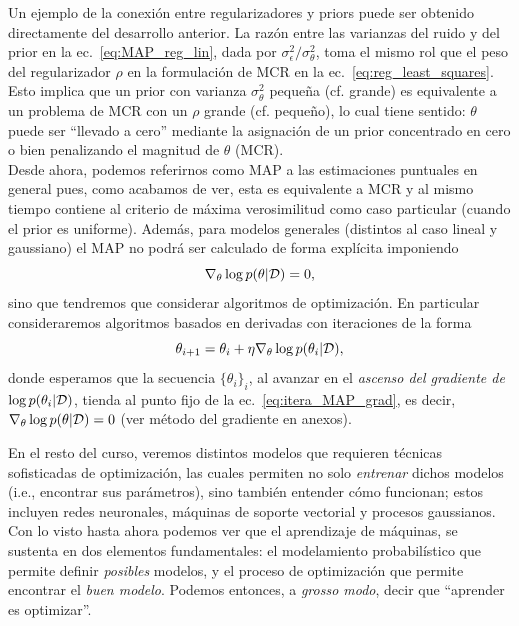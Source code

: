 Un ejemplo de la conexión entre regularizadores y priors puede ser obtenido directamente del desarrollo anterior. La razón entre las varianzas del ruido y del prior en la ec.~\eqref{eq:MAP_reg_lin}, dada por $\sigma_\epsilon^2/\sigma_\theta^2$, toma el mismo rol que el peso del regularizador $\rho$ en la formulación de MCR en la  ec.~\eqref{eq:reg_least_squares}. Esto implica que un prior con varianza $\sigma_\theta^2$ pequeña (cf. grande) es equivalente a un problema de MCR con un $\rho$ grande (cf. pequeño), lo cual tiene sentido:  $\theta$ puede ser ``llevado a cero'' mediante la asignación de un prior concentrado en cero o bien penalizando el magnitud de $\theta$ (MCR).\\

Desde ahora, podemos referirnos como MAP a las estimaciones puntuales en general pues, como acabamos de ver, esta es equivalente a MCR y al mismo tiempo contiene al criterio de máxima verosimilitud como caso particular (cuando el prior es uniforme). Además, para modelos generales (distintos al caso lineal y gaussiano) el MAP no podrá ser calculado de forma explícita imponiendo 
\begin{equation}
 	\nabla_\theta  \log p(\theta|{\mathcal D}) = 0,
 \end{equation}
 sino que tendremos que considerar algoritmos de optimización. En particular consideraremos algoritmos basados en derivadas con iteraciones de la forma
 \begin{equation}
 	\theta_{i+1} = \theta_i + \eta \nabla_\theta  \log p(\theta_i|{\mathcal D}), \label{eq:itera_MAP_grad}
 \end{equation}
 donde esperamos que la secuencia $\{\theta_i\}_i$, al avanzar en el \emph{ascenso del gradiente de $\log p(\theta_i|{\mathcal D})$}, tienda al punto fijo de la ec.~\eqref{eq:itera_MAP_grad}, es decir, $\nabla_\theta  \log p(\theta|{\mathcal D}) = 0$ (ver método del gradiente en anexos). 

\begin{remark} 
En el resto del curso, veremos distintos modelos que requieren técnicas sofisticadas de optimización, las cuales permiten no solo \emph{entrenar} dichos modelos (i.e., encontrar sus parámetros), sino también entender cómo funcionan; estos incluyen redes neuronales,  máquinas de soporte vectorial y procesos gaussianos. Con lo visto hasta ahora podemos ver que el aprendizaje de máquinas, se sustenta  en dos elementos fundamentales: el modelamiento probabilístico que permite definir \emph{posibles} modelos, y el proceso de optimización que permite encontrar el \emph{buen modelo}. Podemos entonces, a \emph{grosso modo}, decir que ``aprender es optimizar''.
\end{remark}


